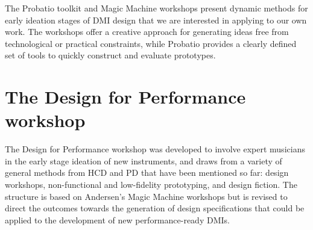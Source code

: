 \documentclass[letterpaper, 12pt]{article}
\begin{document}
The Probatio toolkit and Magic Machine workshops present dynamic methods for early ideation stages of DMI design that we are interested in applying to our own work. The workshops offer a creative approach for generating ideas free from technological or practical constraints, while Probatio provides a clearly defined set of tools to quickly construct and evaluate prototypes. 

\section{The Design for Performance workshop}
\label{sec:design-for-performance-workshop}

The Design for Performance workshop was developed to involve expert musicians in the early stage ideation of new instruments, and draws from a variety of general methods from HCD and PD that have been mentioned so far: design workshops, non-functional and low-fidelity prototyping, and design fiction. 
The structure is based on Andersen's Magic Machine workshops but is revised to direct the outcomes towards the generation of design specifications that could be applied to the development of new performance-ready DMIs. 
\end{document}
